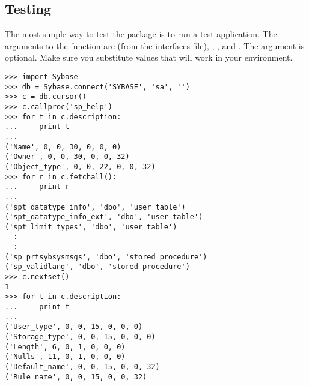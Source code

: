 \subsection{Testing}

The most simple way to test the  package is to run a
test application.  The arguments to the 
function are  (from the interfaces file), ,
, and .  The  argument is
optional.  Make sure you substitute values that will work in your
environment.

\begin{verbatim}
>>> import Sybase
>>> db = Sybase.connect('SYBASE', 'sa', '')
>>> c = db.cursor()
>>> c.callproc('sp_help')
>>> for t in c.description:
...     print t
... 
('Name', 0, 0, 30, 0, 0, 0)
('Owner', 0, 0, 30, 0, 0, 32)
('Object_type', 0, 0, 22, 0, 0, 32)
>>> for r in c.fetchall():
...     print r
... 
('spt_datatype_info', 'dbo', 'user table')
('spt_datatype_info_ext', 'dbo', 'user table')
('spt_limit_types', 'dbo', 'user table')
  :
  :
('sp_prtsybsysmsgs', 'dbo', 'stored procedure')
('sp_validlang', 'dbo', 'stored procedure')
>>> c.nextset()
1
>>> for t in c.description:
...     print t
... 
('User_type', 0, 0, 15, 0, 0, 0)
('Storage_type', 0, 0, 15, 0, 0, 0)
('Length', 6, 0, 1, 0, 0, 0)
('Nulls', 11, 0, 1, 0, 0, 0)
('Default_name', 0, 0, 15, 0, 0, 32)
('Rule_name', 0, 0, 15, 0, 0, 32)
\end{verbatim}
